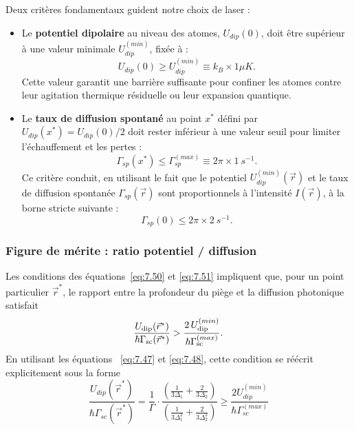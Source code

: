Deux critères fondamentaux guident notre choix de laser :
\begin{itemize}[label = $\bullet$]
	\item Le {\bf potentiel dipolaire} au niveau des atomes, $U_{dip}(0)$, doit être supérieur à une valeur minimale $U_{dip}^{(min)}$, fixée à :
		\begin{equation}\label{eq:7.50}
			U_{dip}(0)  \geq U_{dip}^{(min)} \equiv k_B \times 1 \mu K.	
		\end{equation}
		Cette valeur garantit une barrière suffisante pour confiner les atomes contre leur agitation thermique résiduelle ou leur expansion quantique.
	\item Le {\bf taux de diffusion spontané}  au point $x^\ast$ défini par $U_{dip}(x^\ast) = U_{dip}(0)/2$ doit rester inférieur à une valeur seuil pour limiter l’échauffement et les pertes :
		\begin{equation}\label{eq:7.51}
			\Gamma_{sp}(x^\ast) \leq \Gamma_{sp}^{(max)} \equiv 2\pi \times 1~s^{-1}.	
		\end{equation}
		Ce critère conduit, en utilisant le fait que le potentiel $U_{dip}^{(min)}(\vec{r})$ et le taux de diffusion spontanée $\Gamma_{sp}(\vec{r})$ sont proportionnels à l’intensité $I(\vec{r})$, à la borne stricte suivante :
		\begin{equation}\label{eq:7.52}
			\Gamma_{sp}(0) \leq  2\pi \times 2~s^{-1}.	
		\end{equation}
\end{itemize}

\subsubsection*{Figure de mérite : ratio potentiel / diffusion}

Les conditions des équations~\eqref{eq:7.50} et \eqref{eq:7.51} impliquent que, pour un point particulier \(\vec{r}^*\), le rapport entre la profondeur du piège et la diffusion photonique satisfait
\[
\frac{U_{\rm dip}(\vec{r}^*)}{\hbar \Gamma_{\rm sc}(\vec{r}^*)} > \frac{2\,U_{\rm dip}^{(min)}}{\hbar \Gamma_{\rm sc}^{(max)}} .
\]
En utilisant les équations ~\eqref{eq:7.47} et \eqref{eq:7.48}, cette condition se réécrit explicitement sous la forme
%
%
\begin{equation}
\frac{U_{dip}(\vec{r}^*)}{\hbar \Gamma_{sc}(\vec{r}^*)} = \frac{1}{\Gamma} \cdot \frac{ \left( \frac{1}{3\Delta_1} + \frac{2}{3\Delta_2} \right)}{\left( \frac{1}{3\Delta_1^2} + \frac{2}{3\Delta_2^2} \right)} \geq \frac{2 U_{dip}^{(min)}}{\hbar \Gamma_{sc}^{(max)}}
\end{equation}

